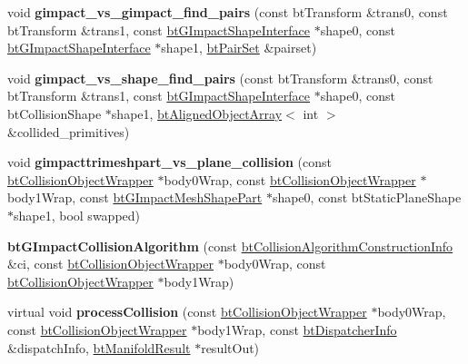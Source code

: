 \begin{DoxyCompactItemize}
void {\bfseries gimpact\+\_\+vs\+\_\+gimpact\+\_\+find\+\_\+pairs} (const bt\+Transform \&trans0, const bt\+Transform \&trans1, const \hyperlink{classbtGImpactShapeInterface}{bt\+G\+Impact\+Shape\+Interface} $\ast$shape0, const \hyperlink{classbtGImpactShapeInterface}{bt\+G\+Impact\+Shape\+Interface} $\ast$shape1, \hyperlink{classbtPairSet}{bt\+Pair\+Set} \&pairset)
\item 
\mbox{\label{classbtGImpactCollisionAlgorithm_a0e70c6b89a8b9295a6bc63365bbaa12e}} 
void {\bfseries gimpact\+\_\+vs\+\_\+shape\+\_\+find\+\_\+pairs} (const bt\+Transform \&trans0, const bt\+Transform \&trans1, const \hyperlink{classbtGImpactShapeInterface}{bt\+G\+Impact\+Shape\+Interface} $\ast$shape0, const bt\+Collision\+Shape $\ast$shape1, \hyperlink{classbtAlignedObjectArray}{bt\+Aligned\+Object\+Array}$<$ int $>$ \&collided\+\_\+primitives)
\item 
\mbox{\label{classbtGImpactCollisionAlgorithm_a3b23f83487de9f2396aff733ad68cea4}} 
void {\bfseries gimpacttrimeshpart\+\_\+vs\+\_\+plane\+\_\+collision} (const \hyperlink{structbtCollisionObjectWrapper}{bt\+Collision\+Object\+Wrapper} $\ast$body0\+Wrap, const \hyperlink{structbtCollisionObjectWrapper}{bt\+Collision\+Object\+Wrapper} $\ast$body1\+Wrap, const \hyperlink{classbtGImpactMeshShapePart}{bt\+G\+Impact\+Mesh\+Shape\+Part} $\ast$shape0, const bt\+Static\+Plane\+Shape $\ast$shape1, bool swapped)
\item 
\mbox{\label{classbtGImpactCollisionAlgorithm_a38256a591aae44ccd30d4b1891d1c355}} 
{\bfseries bt\+G\+Impact\+Collision\+Algorithm} (const \hyperlink{structbtCollisionAlgorithmConstructionInfo}{bt\+Collision\+Algorithm\+Construction\+Info} \&ci, const \hyperlink{structbtCollisionObjectWrapper}{bt\+Collision\+Object\+Wrapper} $\ast$body0\+Wrap, const \hyperlink{structbtCollisionObjectWrapper}{bt\+Collision\+Object\+Wrapper} $\ast$body1\+Wrap)
\item 
\mbox{\label{classbtGImpactCollisionAlgorithm_aa7d3ea8514472bdec3eae8fabf428727}} 
virtual void {\bfseries process\+Collision} (const \hyperlink{structbtCollisionObjectWrapper}{bt\+Collision\+Object\+Wrapper} $\ast$body0\+Wrap, const \hyperlink{structbtCollisionObjectWrapper}{bt\+Collision\+Object\+Wrapper} $\ast$body1\+Wrap, const \hyperlink{structbtDispatcherInfo}{bt\+Dispatcher\+Info} \&dispatch\+Info, \hyperlink{classbtManifoldResult}{bt\+Manifold\+Result} $\ast$result\+Out)

\end{DoxyCompactItemize}
